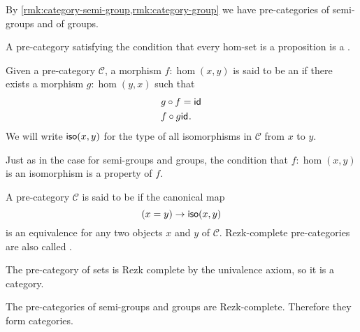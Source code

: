 \begin{eg}
  By \cref{rmk:category-semi-group,rmk:category-group} we have pre-categories of semi-groups and of groups.
\end{eg}

\begin{eg}
  A pre-category satisfying the condition that every hom-set is a proposition is a . 
\end{eg}

\begin{defn}
  Given a pre-category $\mathcal{C}$, a morphism $f:\hom(x,y)$ is said to be an  if there exists a morphism $g:\hom(y,x)$ such that
  \begin{align*}
    g\circ f & = \mathsf{id}_{} \\
    f \circ g & \mathsf{id}_{}.
  \end{align*}
  We will write $\mathsf{iso}(x,y)$ for the type of all isomorphisms in $\mathcal{C}$ from $x$ to $y$.
\end{defn}

\begin{rmk}
  Just as in the case for semi-groups and groups, the condition that $f:\hom(x,y)$ is an isomorphism is a property of $f$.
\end{rmk}

\begin{defn}
  A pre-category $\mathcal{C}$ is said to be  if the canonical map
  \begin{equation*}
    (x=y)\to \mathsf{iso}(x,y)
  \end{equation*}
  is an equivalence for any two objects $x$ and $y$ of $\mathcal{C}$. Rezk-complete pre-categories are also called .
\end{defn}

\begin{eg}
  The pre-category of sets is Rezk complete by the univalence axiom, so it is a category.
\end{eg}

\begin{eg}
  The pre-categories of semi-groups and groups are Rezk-complete. Therefore they form categories.
\end{eg}

